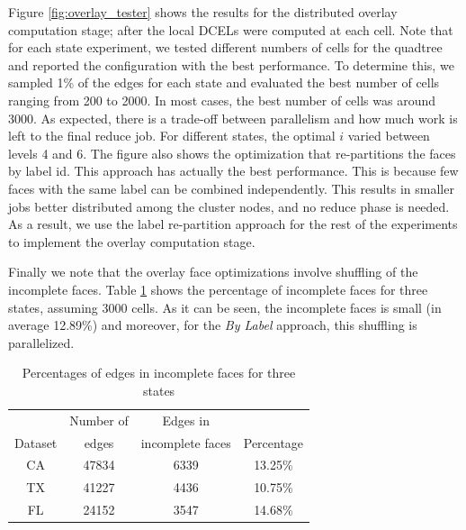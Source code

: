 Figure \ref{fig:overlay_tester} shows the results for the distributed overlay computation stage; after the local DCELs were computed at each cell. 
Note that for each state experiment, we tested different numbers of cells for the quadtree and reported the configuration with the best performance. To determine this, we sampled 1\% of the edges for each state and evaluated the best number of cells ranging from 200 to 2000. In most cases, the best number of cells was around 3000.
As expected, there is a trade-off between parallelism and how much work is left to the final reduce job. For different states, the optimal $i$ varied between levels 4 and 6. The figure also shows the optimization that re-partitions the faces by label id. This approach has actually the best performance. This is because few faces with the same label can be combined independently. This results in smaller jobs better distributed among the cluster nodes, and no reduce phase is needed. As a result, we use the label re-partition approach for the rest of the experiments to implement the overlay computation stage.

Finally we note that the overlay face optimizations involve shuffling of the incomplete faces. Table \ref{tab:percentages} shows the percentage of incomplete faces for three states, assuming 3000 cells. As it can be seen, the incomplete faces is small (in average 12.89\%) and moreover, for the \textit{By Label} approach, this shuffling is parallelized.

\begin{table}
    \centering
    \caption{Percentages of edges in incomplete faces for three states} \label{tab:percentages}
    \begin{tabular}{cccc}
        \hline
                & Number of & Edges in         &            \\
        Dataset & edges     & incomplete faces & Percentage \\
        \hline
        CA &  47834 &  6339 & 13.25\% \\
        TX &  41227 &  4436 & 10.75\%\\
        FL &  24152 &  3547 & 14.68\%\\
        \hline
    \end{tabular}
\end{table}

